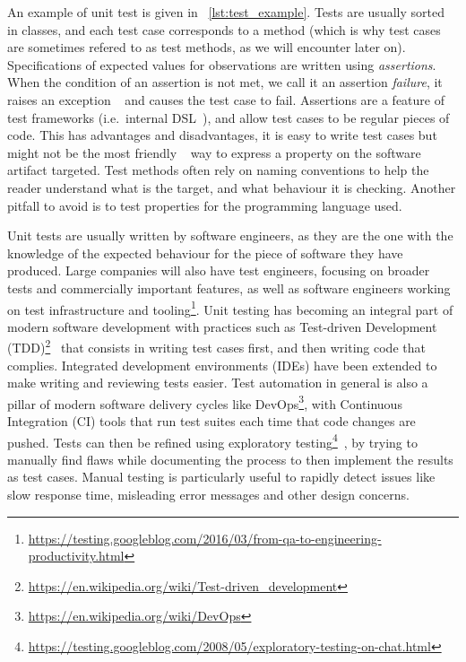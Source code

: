 \documentclass[a4paper,11pt]{sdm_internship}
\newcommand{\rephrase}[1]{\colorbox{BlueViolet!60}{\textcolor{white}{\textbf{$\sim$#1}}}}
\theoremstyle{definition}
\begin{document}
An example of unit test is given in \listingname~\ref{lst:test_example}.
Tests are usually sorted in classes, and each test case corresponds to a method (which is why test cases are sometimes refered to as test methods, as we will encounter later on).
Specifications of expected values for observations are written using \emph{assertions}.
When the condition of an assertion is not met, we call it an assertion \emph{failure}, it raises an exception\rephrase{} and causes the test case to fail.
Assertions are a feature of test frameworks (i.e.\ internal DSL~\cite{fowler2010domain}), and allow test cases to be regular pieces of code.
This has advantages and disadvantages, it is easy to write test cases but might not be the most friendly\rephrase{} way to express a property on the software artifact targeted.
Test methods often rely on naming conventions to help the reader understand what is the target, and what behaviour it is checking.
Another pitfall to avoid is to test properties for the programming language used.

Unit tests are usually written by software engineers, as they are the one with the knowledge of the expected behaviour for the piece of software they have produced.
Large companies will also have test engineers, focusing on broader tests and commercially important features, as well as software engineers working on test infrastructure and tooling\footnote{\url{https://testing.googleblog.com/2016/03/from-qa-to-engineering-productivity.html}}.
Unit testing has becoming an integral part of modern software development with practices such as Test-driven Development (TDD)\footnote{\url{https://en.wikipedia.org/wiki/Test-driven_development}}~\cite{beck2003test} that consists in writing test cases first, and then writing code that complies.
Integrated development environments (IDEs) have been extended to make writing and reviewing tests easier.
Test automation in general is also a pillar of modern software delivery cycles like DevOps\footnote{\url{https://en.wikipedia.org/wiki/DevOps}}, with Continuous Integration (CI) tools that run test suites each time that code changes are pushed.
Tests can then be refined using exploratory testing\footnote{\url{https://testing.googleblog.com/2008/05/exploratory-testing-on-chat.html}}~\cite{kaner2000testing}, by trying to manually find flaws while documenting the process to then implement the results as test cases.
Manual testing is particularly useful to rapidly detect issues like slow response time, misleading error messages and other design concerns.
\end{document}
